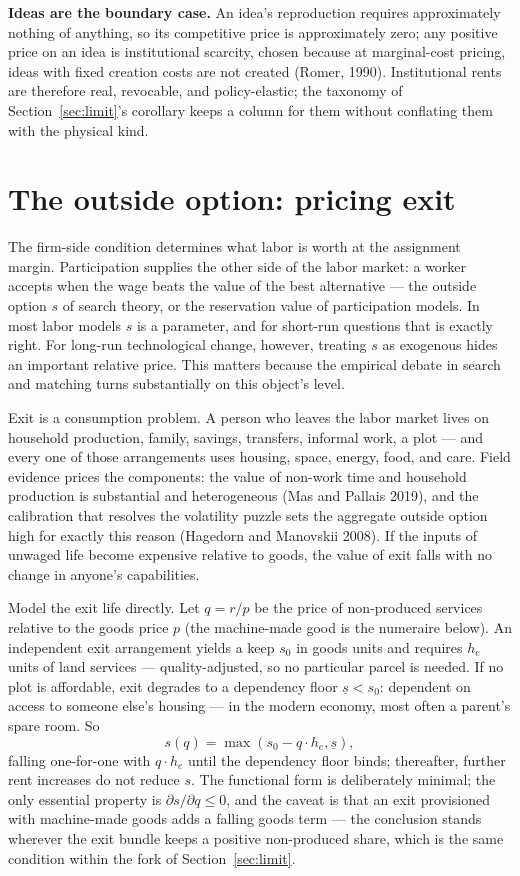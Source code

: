 \documentclass[12pt]{article}
\theoremstyle{plain}
\begin{document}
\textbf{Ideas are the boundary case.} An idea's reproduction requires
approximately nothing of anything, so its competitive price is approximately
zero; any positive price on an idea is institutional scarcity, chosen because at marginal-cost pricing, ideas
with fixed creation costs are not created (Romer, 1990). Institutional rents are therefore
real, revocable, and policy-elastic; the taxonomy of
Section~\ref{sec:limit}'s corollary keeps a column for them without conflating
them with the physical kind.

\section{The outside option: pricing exit}\label{sec:floor}

The firm-side condition determines what labor is worth at the assignment margin.
Participation supplies the other side of the labor market: a worker accepts when
the wage beats the value of the best alternative --- the outside option $s$ of
search theory, or the reservation value of participation models. In most labor
models $s$ is a parameter, and for short-run questions that is exactly right.
For long-run technological change, however, treating $s$ as exogenous hides an important relative price. This matters because the empirical debate in search and matching turns substantially on this object's level.

Exit is a consumption problem. A person who leaves the labor market lives on
household production, family, savings, transfers, informal work, a plot --- and
every one of those arrangements uses housing, space, energy, food, and care.
Field evidence prices the components: the value of non-work time and household
production is substantial and heterogeneous (Mas and Pallais 2019), and the
calibration that resolves the volatility puzzle sets the aggregate outside
option high for exactly this reason (Hagedorn and Manovskii 2008). If the inputs
of unwaged life become expensive relative to goods, the value of exit falls with
no change in anyone's capabilities.

Model the exit life directly. Let $q = r/p$ be the price of non-produced services relative to the goods price $p$ (the machine-made good is the numeraire below). An independent exit arrangement yields a keep $s_0$ in goods units and requires $h_e$ units of land services --- quality-adjusted, so no particular parcel is needed. If no plot is affordable, exit degrades to a dependency floor $\underline{s} < s_0$: dependent on access to someone else's housing --- in the modern economy, most often a parent's spare room. So
\begin{equation}\label{eq:exit}
s(q) = \max( s_0 - q\cdot h_e , \underline{s} ),
\end{equation}
falling one-for-one with $q\cdot h_e$ until the dependency floor binds; thereafter, further rent increases do not reduce $s$. The functional form is deliberately minimal; the only essential property is $\partial s/\partial q \le 0$, and the caveat is that an exit provisioned with machine-made goods adds a falling goods term --- the conclusion stands wherever the exit bundle keeps a positive non-produced share, which is the same condition within the fork of Section~\ref{sec:limit}.
\end{document}
